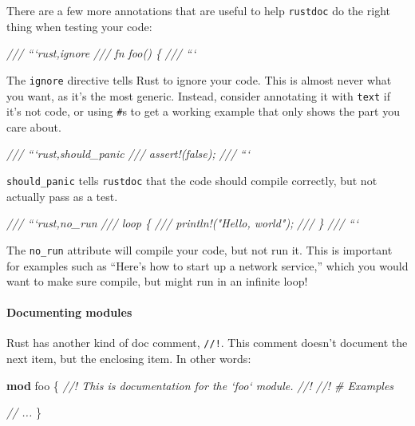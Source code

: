 \documentclass[a4paper,]{book}
\newenvironment{Shaded}{\begin{snugshade}}{\end{snugshade}}
\newcommand{\KeywordTok}[1]{\textcolor[rgb]{0.13,0.29,0.53}{\textbf{{#1}}}}
\newcommand{\CommentTok}[1]{\textcolor[rgb]{0.56,0.35,0.01}{\textit{{#1}}}}
\newcommand{\NormalTok}[1]{{#1}}
\let\oldparagraph\paragraph
\renewcommand{\paragraph}[1]{\oldparagraph{#1}\mbox{}}
\begin{document}
There are a few more annotations that are useful to help
\texttt{rustdoc} do the right thing when testing your code:

\begin{Shaded}
\begin{Highlighting}[]
\CommentTok{/// ```rust,ignore}
\CommentTok{/// fn foo() \{}
\CommentTok{/// ```}
\end{Highlighting}
\end{Shaded}

The \texttt{ignore} directive tells Rust to ignore your code. This is
almost never what you want, as it's the most generic. Instead, consider
annotating it with \texttt{text} if it's not code, or using \texttt{\#}s
to get a working example that only shows the part you care about.

\begin{Shaded}
\begin{Highlighting}[]
\CommentTok{/// ```rust,should_panic}
\CommentTok{/// assert!(false);}
\CommentTok{/// ```}
\end{Highlighting}
\end{Shaded}

\texttt{should\_panic} tells \texttt{rustdoc} that the code should
compile correctly, but not actually pass as a test.

\begin{Shaded}
\begin{Highlighting}[]
\CommentTok{/// ```rust,no_run}
\CommentTok{/// loop \{}
\CommentTok{///     println!("Hello, world");}
\CommentTok{/// \}}
\CommentTok{/// ```}
\end{Highlighting}
\end{Shaded}

The \texttt{no\_run} attribute will compile your code, but not run it.
This is important for examples such as ``Here's how to start up a
network service,'' which you would want to make sure compile, but might
run in an infinite loop!

\paragraph{Documenting modules}\label{documenting-modules}

Rust has another kind of doc comment, \texttt{//!}. This comment doesn't
document the next item, but the enclosing item. In other words:

\begin{Shaded}
\begin{Highlighting}[]
\KeywordTok{mod} \NormalTok{foo \{}
    \CommentTok{//! This is documentation for the `foo` module.}
    \CommentTok{//!}
    \CommentTok{//! # Examples}

    \CommentTok{// ...}
\NormalTok{\}}
\end{Highlighting}
\end{Shaded}
\end{document}
